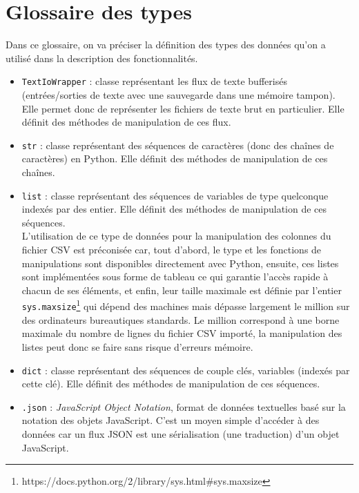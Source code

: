 	\section{Glossaire des types}
		Dans ce glossaire, on va préciser la définition des types des données qu'on a utilisé dans la description des fonctionnalités.
		\begin{itemize}
			\item \lstinline!TextIoWrapper! : classe représentant les flux de texte bufferisés (entrées/sorties de texte avec une sauvegarde dans une mémoire tampon). Elle permet donc de représenter les fichiers de texte brut en particulier. Elle définit des méthodes de manipulation de ces flux.
			\item \lstinline!str! : classe représentant des séquences de caractères (donc des chaînes de caractères) en Python. Elle définit des méthodes de manipulation de ces chaînes.
			\item \lstinline!list! : classe représentant des séquences de variables de type quelconque indexés par des entier. Elle définit des méthodes de manipulation de ces séquences.\\
			L'utilisation de ce type de données pour la manipulation des colonnes du fichier CSV est préconisée car, tout d'abord, le type et les fonctions de manipulations sont disponibles directement avec Python, ensuite, ces listes sont implémentées sous forme de tableau ce qui garantie l'accès rapide à chacun de ses éléments, et enfin, leur taille maximale est définie par l'entier \lstinline!sys.maxsize!\footnote{https://docs.python.org/2/library/sys.html\#sys.maxsize} qui dépend des machines mais dépasse largement le million sur des ordinateurs bureautiques standards. Le million correspond à une borne maximale du nombre de lignes du fichier CSV importé, la manipulation des listes peut donc se faire sans risque d'erreurs mémoire.
			\item \lstinline!dict! : classe représentant des séquences de couple clés, variables (indexés par cette clé). Elle définit des méthodes de manipulation de ces séquences.
			\item \lstinline!.json! : \textit{JavaScript Object Notation}, format de données textuelles basé sur la notation des objets JavaScript. C'est un moyen simple d'accéder à des données car un flux JSON est une sérialisation (une traduction) d'un objet JavaScript.
 		\end{itemize}
	
